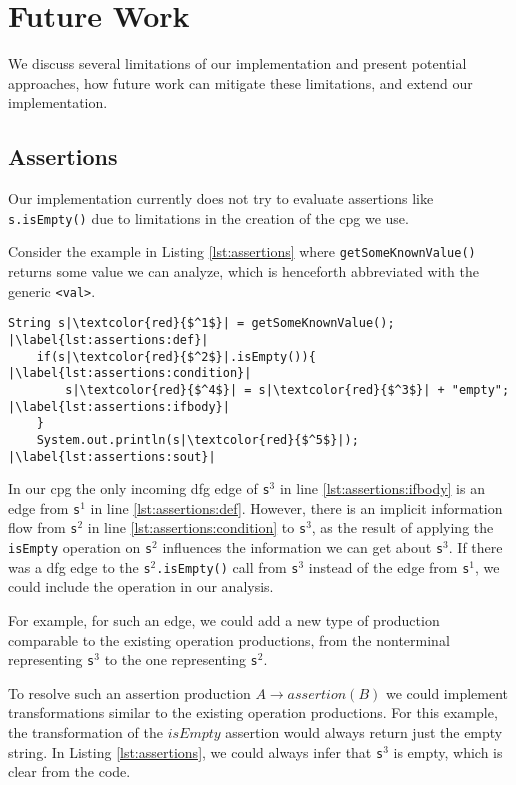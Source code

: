 \section{Future Work}

We discuss several limitations of our implementation and present potential approaches, how future work can mitigate these limitations, and extend our implementation.

\subsection{Assertions}

Our implementation currently does not try to evaluate assertions like \lstinline|s.isEmpty()| due to limitations in the creation of the \ac{cpg} we use.

Consider the example in Listing \ref{lst:assertions} where \lstinline|getSomeKnownValue()| returns some value we can analyze, which is henceforth abbreviated with the generic \lstinline|<val>|.

\begin{lstlisting}[caption={Assertion Example}, label=lst:assertions, numbers=right, escapechar=|]
	String s|\textcolor{red}{$^1$}| = getSomeKnownValue(); |\label{lst:assertions:def}|
	if(s|\textcolor{red}{$^2$}|.isEmpty()){ |\label{lst:assertions:condition}|
		s|\textcolor{red}{$^4$}| = s|\textcolor{red}{$^3$}| + "empty"; |\label{lst:assertions:ifbody}|
	}
	System.out.println(s|\textcolor{red}{$^5$}|); |\label{lst:assertions:sout}|
\end{lstlisting}

In our \ac{cpg} the only incoming \ac{dfg} edge of \lstinline|s|$^3$ in line \ref{lst:assertions:ifbody} is an edge from \lstinline|s|$^1$ in line \ref{lst:assertions:def}. However, there is an implicit information flow from \lstinline|s|$^2$ in line \ref{lst:assertions:condition} to \lstinline|s|$^3$, as the result of applying the \lstinline|isEmpty| operation on \lstinline|s|$^2$ influences the information we can get about \lstinline|s|$^3$. If there was a \ac{dfg} edge to the \lstinline|s|$^2$\lstinline|.isEmpty()| call from \lstinline|s|$^3$ instead of the edge from \lstinline|s|$^1$, we could include the operation in our analysis.

For example, for such an edge, we could add a new type of production comparable to the existing operation productions, from the nonterminal representing \lstinline|s|$^3$ to the one representing \lstinline|s|$^2$.

To resolve such an assertion production $A \rightarrow assertion(B)$ we could implement transformations similar to the existing operation productions. For this example, the transformation of the $isEmpty$ assertion would always return just the empty string.
In Listing \ref{lst:assertions}, we could always infer that \lstinline|s|$^3$ is empty, which is clear from the code.

